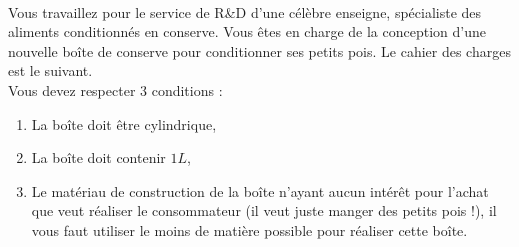 \probleme~\\

Vous travaillez pour le service de R\&D d'une célèbre enseigne, spécialiste des aliments conditionnés en conserve.
Vous êtes en charge de la conception d'une nouvelle boîte de conserve pour conditionner ses petits pois.
Le cahier des charges est le suivant.\\

\noindent Vous devez respecter 3 conditions : \\

\begin{enumerate}
	\item La boîte doit être cylindrique,\\
	\item La boîte doit contenir $1L$,\\
	\item Le matériau de construction de la boîte n'ayant aucun intérêt pour l'achat que veut réaliser le consommateur (il veut juste manger des petits pois !), il vous faut utiliser le moins de matière possible pour réaliser cette boîte.\\
\end{enumerate}

\hfill\AUTRAVAIL